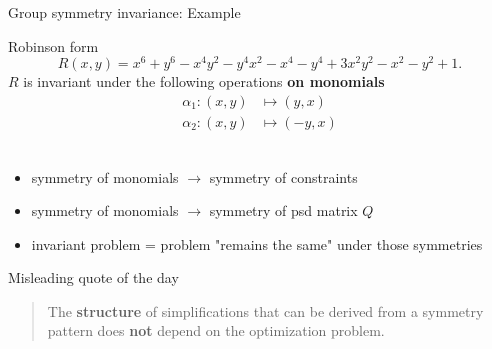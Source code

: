 \begin{frame}{Group symmetry invariance: Example}
\vspace*{0.2in}
  \begin{block}{Robinson form}
      $$
      R(x,y) = x^6 + y^6 - x^4y^2 - y^4x^2 - x^4 - y^4  + 3x^2y^2 - x^2 - y^2 + 1.
      $$
  \vspace{-.1in}
      $R$ is invariant under the following operations \textbf{on monomials}
      \begin{align*}
        \alpha_1 \colon (x, y) & \mapsto (y, x)\\
        \alpha_2 \colon (x, y) & \mapsto (-y, x)
      \end{align*}
    \\[-0.6in]
    
  \end{block}
    \pause

  \begin{itemize}
    \item symmetry of monomials $\longrightarrow$ symmetry of constraints
    \item symmetry of monomials $\longrightarrow$ symmetry of psd matrix $Q$
    \item invariant problem = problem "remains the same" under those symmetries
  \end{itemize}

\end{frame}


\begin{frame}[standout]{Misleading quote of the day}
  
  \begin{quote}
    \noindent The \textbf{structure} of simplifications that can be derived from a symmetry pattern does \textbf{not} depend on the optimization problem.
  \end{quote}
  
\end{frame}

